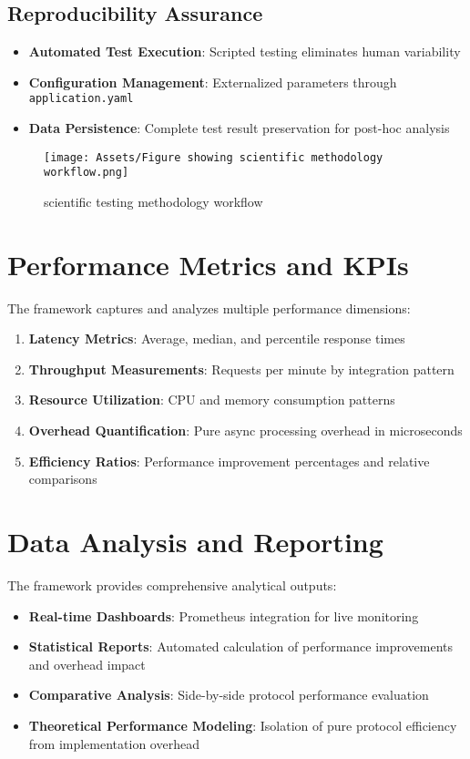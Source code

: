 \subsection{Reproducibility Assurance}

\begin{itemize}
    \item \textbf{Automated Test Execution}: Scripted testing eliminates human variability
    \item \textbf{Configuration Management}: Externalized parameters through \texttt{application.yaml}
    \item \textbf{Data Persistence}: Complete test result preservation for post-hoc analysis
\end{itemize}

\begin{figure}[H]
    \centering
    \texttt{[image: Assets/Figure showing scientific methodology workflow.png]}
    \caption{scientific testing methodology workflow}
\end{figure}


\section{Performance Metrics and KPIs}

The framework captures and analyzes multiple performance dimensions:

\begin{enumerate}
    \item \textbf{Latency Metrics}: Average, median, and percentile response times
    \item \textbf{Throughput Measurements}: Requests per minute by integration pattern
    \item \textbf{Resource Utilization}: CPU and memory consumption patterns
    \item \textbf{Overhead Quantification}: Pure async processing overhead in microseconds
    \item \textbf{Efficiency Ratios}: Performance improvement percentages and relative comparisons
\end{enumerate}


\section{Data Analysis and Reporting}

The framework provides comprehensive analytical outputs:
\begin{itemize}
    \item \textbf{Real-time Dashboards}: Prometheus integration for live monitoring
    \item \textbf{Statistical Reports}: Automated calculation of performance improvements and overhead impact
    \item \textbf{Comparative Analysis}: Side-by-side protocol performance evaluation
    \item \textbf{Theoretical Performance Modeling}: Isolation of pure protocol efficiency from implementation overhead
\end{itemize}


